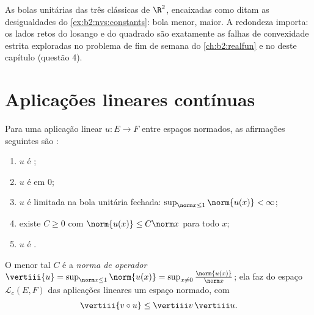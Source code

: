 \begin{omfigure}

{\small As bolas unitárias das três  clássicas de $\R^2$,
encaixadas como ditam as desigualdades do
\cref{ex:b2:nvs:constants}: bola menor,  maior. A redondeza importa: os lados
retos do losango e do quadrado são exatamente as falhas de
convexidade estrita exploradas no problema de fim de semana do
\cref{ch:b2:realfun} e no deste capítulo (questão 4).}
\end{omfigure}

\section{Aplicações lineares contínuas}

\begin{theorem}[Caracterização]\label{thm:b2:nvs:continuouslinear}
Para uma aplicação linear $u \colon E \to F$ entre espaços normados, as
afirmações seguintes são :
\begin{enumerate}
  \item $u$ é ;
  \item $u$ é  em $0$;
  \item $u$ é limitada na bola unitária fechada: $\sup_{\norm x \leq
        1} \norm{u(x)} < \infty$;
  \item existe $C \geq 0$ com $\norm{u(x)} \leq C \norm x$ para
        todo $x$;
  \item $u$ é .
\end{enumerate}
O menor tal $C$ é a \emph{norma de operador}
$\vertiii{u} = \sup_{\norm x \leq 1}\norm{u(x)} = \sup_{x \neq 0}
\frac{\norm{u(x)}}{\norm x}$; ela faz do espaço $\mathcal{L}_c(E,
F)$ das aplicações lineares  um espaço normado, com
\[
\vertiii{v \circ u} \leq \vertiii v\, \vertiii u .
\]
\end{theorem}

